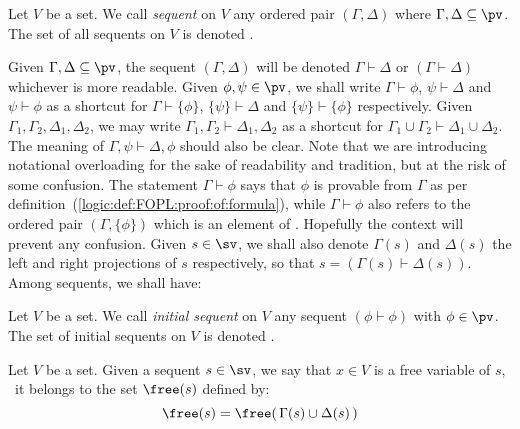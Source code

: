  

\begin{defin}\label{logic:def:GENZ:UAsequents:sequent}
Let $V$ be a set. We call {\em sequent} on $V$ any ordered pair
$(\Gamma,\Delta)$ where $\Gamma,\Delta\subseteq\pv$. The set of all
sequents on $V$ is denoted \sv.
\end{defin}

Given $\Gamma,\Delta\subseteq\pv$, the sequent $(\Gamma,\Delta)$
will be denoted $\Gamma\vdash\Delta$ or $(\Gamma\vdash\Delta)$
whichever is more readable. Given $\phi,\psi\in\pv$, we shall write
$\Gamma\vdash\phi$, $\psi\vdash\Delta$ and $\psi\vdash\phi$ as a
shortcut for $\Gamma\vdash\{\phi\}$, $\{\psi\}\vdash\Delta$ and
$\{\psi\}\vdash\{\phi\}$ respectively. Given
$\Gamma_{1},\Gamma_{2},\Delta_{1},\Delta_{2}$, we may write
$\Gamma_{1},\Gamma_{2}\vdash\Delta_{1},\Delta_{2}$ as a shortcut for
$\Gamma_{1}\cup\Gamma_{2}\vdash\Delta_{1}\cup\Delta_{2}$. The
meaning of $\Gamma,\psi\vdash\Delta,\phi$ should also be clear. Note
that we are introducing notational overloading for the sake of
readability and tradition, but at the risk of some confusion. The
statement $\Gamma\vdash\phi$ says that $\phi$ is provable from
$\Gamma$ as per definition~(\ref{logic:def:FOPL:proof:of:formula}),
while $\Gamma\vdash\phi$ also refers to the ordered pair
$(\Gamma,\{\phi\})$ which is an element of \sv. Hopefully the
context will prevent any confusion. Given $s\in\sv$, we shall also
denote $\Gamma(s)$ and $\Delta(s)$ the left and right projections of
$s$ respectively, so that $s=(\Gamma(s)\vdash\Delta(s))$. Among
sequents, we shall have:

\begin{defin}\label{logic:def:GENZ:UAsequents:elementary:sequent}
Let $V$ be a set. We call {\em initial sequent} on $V$ any sequent
$(\phi\vdash\phi)$ with $\phi\in\pv$. The set of initial sequents on
$V$ is denoted \svo.
\end{defin}

\begin{defin}\label{logic:def:GENZ:setofsequents:freevar}
Let $V$ be a set. Given a sequent $s\in\sv$, we say that $x\in V$ is
a free variable of $s$, \ifand\ it belongs to the set $\free(s)$
defined by:
    \[
    \free(s)=\free(\,\Gamma(s)\cup\Delta(s)\,)
    \]
\end{defin}
